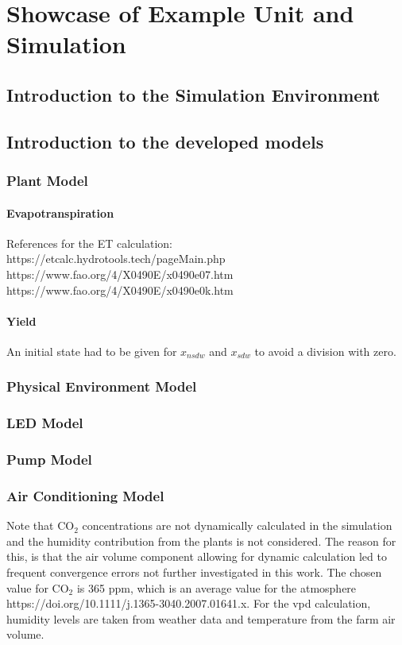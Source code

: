 \chapter{Showcase of Example Unit and Simulation}
\label{chap:simulation}
%
\section{Introduction to the Simulation Environment}

\section{Introduction to the developed models}

\subsection{Plant Model}
\subsubsection{Evapotranspiration}
References for the ET calculation:\\
https://etcalc.hydrotools.tech/pageMain.php\\
https://www.fao.org/4/X0490E/x0490e07.htm\\
https://www.fao.org/4/X0490E/x0490e0k.htm\\

\subsubsection{Yield}
An initial state had to be given for $x_{nsdw}$ and $x_{sdw}$ to avoid a division with zero.

\subsection{Physical Environment Model}

\subsection{LED Model}
\subsection{Pump Model}
\subsection{Air Conditioning Model}
Note that $\text{CO}_2$ concentrations are not dynamically calculated in the simulation and the humidity contribution from the plants is not considered.
The reason for this, is that the air volume component allowing for dynamic calculation led to frequent convergence errors not further investigated in this work.
The chosen value for $\text{CO}_2$ is 365 ppm, which is an average value for the atmosphere https://doi.org/10.1111/j.1365-3040.2007.01641.x.
For the \ac{vpd} calculation, humidity levels are taken from weather data and temperature from the farm air volume.




